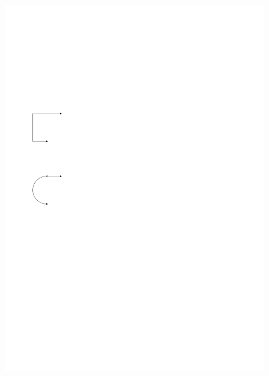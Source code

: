 \documentclass[a4paper]{scrreprt}
\theoremstyle{definition}
\begin{document}
\begin{figure}[h]
            {\includegraphics[scale=.8]{sc2_conversion/UCEdge}}
        \quad

\end{figure}
\end{document}
